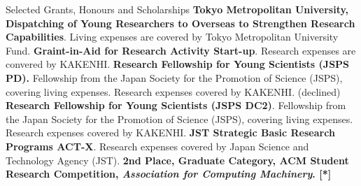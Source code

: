 \begin{rubric}{Selected Grants, Honours and Scholarships}
  \entry*[2025] \textbf{Tokyo Metropolitan University, Dispatching of Young Researchers to
    Overseas to Strengthen Research Capabilities}. Living expenses are covered by Tokyo
  Metropolitan University Fund.
  \entry*[2024] \textbf{Graint-in-Aid for Research Activity Start-up}. Research expenses are convered by KAKENHI.
  \entry*[2023] \textbf{Research Fellowship for Young Scientists (JSPS PD).}
  Fellowship from the Japan Society for the Promotion of Science (JSPS), covering
  living expenses. Research expenses covered by KAKENHI. (declined)
  \entry*[2021] \textbf{Research Fellowship for Young Scientists (JSPS DC2)}.
  Fellowship from the Japan Society for the Promotion of Science (JSPS), covering
  living expenses. Research expenses covered by KAKENHI.
  \entry*[2020] \textbf{JST Strategic Basic Research Programs ACT-X}. Research
  expenses covered by Japan Science and Technology Agency (JST).
  \entry*[2019] \textbf{2nd Place, Graduate Category, ACM Student Research
    Competition, \textit{Association for Computing Machinery}. [*]}
\end{rubric}
